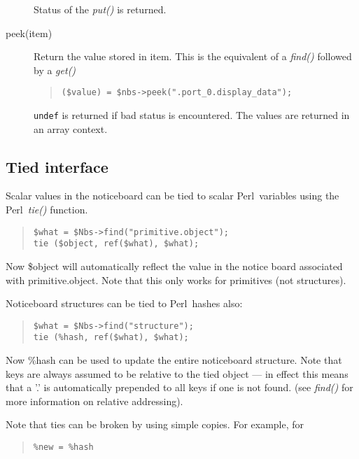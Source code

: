\documentclass[twoside,11pt]{article}
\newenvironment{myquote}{\begin{quote}\begin{small}}{\end{small}\end{quote}}
\newcommand{\perl}{\xref{\textsf{Perl}}{sun193}{}}
\newcommand{\xref}[3]{#1}
\renewcommand{\_}{\texttt{\symbol{95}}}
\begin{document}
\begin{description}
Status of the {\em put()\/} is returned.

\item[peek(item)] \mbox{}

Return the value stored in item. This is the equivalent of a {\em find()\/}
followed by a {\em get()\/}
\begin{myquote}
\begin{verbatim}
($value) = $nbs->peek(".port_0.display_data");
\end{verbatim}
\end{myquote}

\texttt{undef} is returned if bad status is encountered.
The values are returned in an array context.

\end{description}

\subsection{Tied interface}%

Scalar values in the noticeboard can be tied to scalar \perl\ variables
using the \perl\ {\em tie()\/} function.
\begin{myquote}
\begin{verbatim}
$what = $Nbs->find("primitive.object");
tie ($object, ref($what), $what);
\end{verbatim}
\end{myquote} %

Now \$object will automatically reflect the value in the notice board
associated with primitive.object. Note that this only works for
primitives (not structures).

Noticeboard structures can be tied to \perl\ hashes also:
\begin{myquote}
\begin{verbatim}
$what = $Nbs->find("structure");
tie (%hash, ref($what), $what);
\end{verbatim}
\end{myquote}

Now \%hash can be used to update the entire noticeboard structure.
Note that keys are always assumed to be relative to the 
tied object --- in effect this means that a '.' is automatically
prepended to all keys if one is not found. (see {\em find()\/}
for more information on relative addressing).

Note that ties can be broken by using simple copies.
For example, for
\begin{myquote}
\begin{verbatim}
%new = %hash
\end{verbatim}
\end{myquote}
\end{document}
